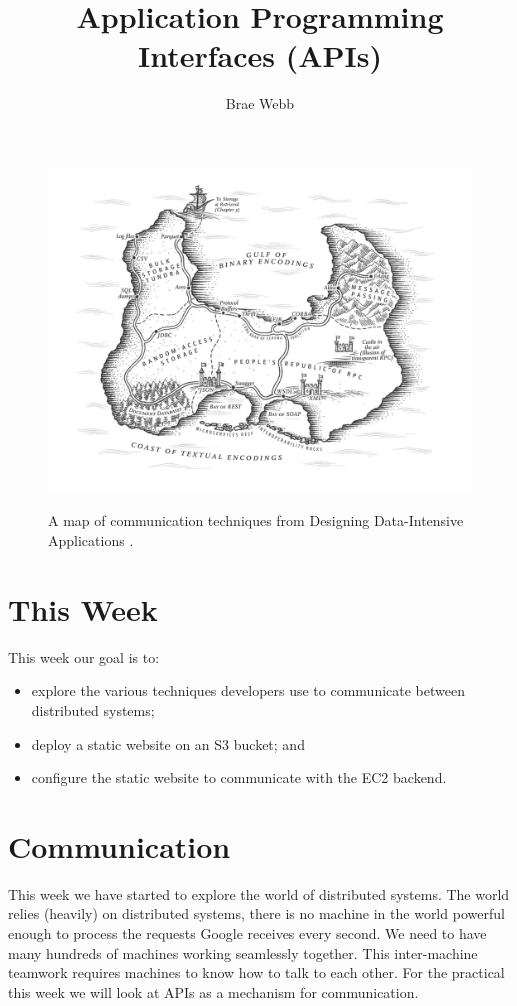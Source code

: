 \documentclass{csse4400}
\title{Application Programming Interfaces (APIs)}
\author{Brae Webb}
\date{\week{5}}
\begin{document}
\maketitle

\begin{figure}[h]
  \href{https://www.oreilly.com/library/view/designing-data-intensive-applications/9781491903063/ch04.html}{
    \includegraphics[width=\textwidth]{images/communication}
  }
\caption{A map of communication techniques from Designing Data-Intensive Applications \cite{data-intensive}.}
\end{figure}

\section{This Week}
This week our goal is to:
\begin{itemize}
  \item explore the various techniques developers use to communicate between distributed systems;
  \item deploy a static website on an S3 bucket; and
  \item configure the static website to communicate with the EC2 backend.
\end{itemize}

\section{Communication}
This week we have started to explore the world of distributed systems.
The world relies (heavily) on distributed systems,
there is no machine in the world powerful enough to process the requests Google receives every second.
We need to have many hundreds of machines working seamlessly together.
This inter-machine teamwork requires machines to know how to talk to each other.
For the practical this week we will look at APIs as a mechanism for communication.
\end{document}
